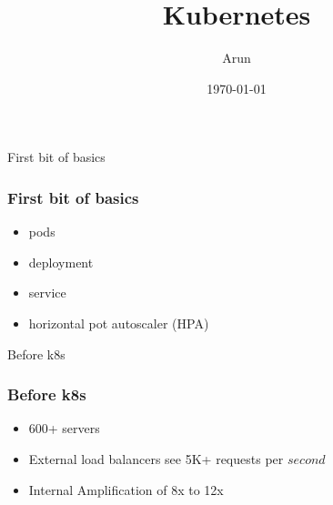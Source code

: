 \documentclass[12pt]{beamer}
\title{Kubernetes}
\author{Arun}
\date{\today}
\begin{document}
    \frame{\titlepage}
    \begin{frame}
        \begin{center}
            \huge{First bit of basics}
        \end{center}
    \end{frame}

    \begin{frame}
        \begin{center}
            \frametitle{First bit of basics}
            \begin{itemize}
                \item pods
                \item deployment
                \item service
                \item horizontal pot autoscaler (HPA)
            \end{itemize}
        \end{center}
    \end{frame}

    \begin{frame}
        \begin{center}
            \huge{Before k8s}
        \end{center}
    \end{frame}

    \begin{frame}
        \frametitle{Before k8s}
        \begin{itemize}
            \item 600+ servers
            \item External load balancers see 5K+ requests per $second$
            \item Internal Amplification of 8x to 12x
        \end{itemize}
    \end{frame}
\end{document}

